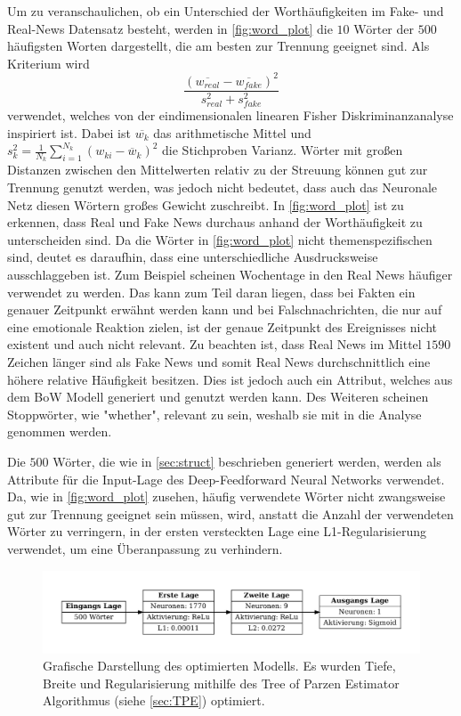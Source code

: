 Um zu veranschaulichen, ob ein Unterschied der Worthäufigkeiten im Fake- und Real-News Datensatz besteht, werden in \autoref{fig:word_plot}
die $10$ Wörter der $500$ häufigsten Worten dargestellt, die am besten zur Trennung geeignet sind. 
Als Kriterium wird 
\begin{equation}
    \frac{(\overline{w_{real}}-\overline{w_{fake}})^2}{s_{real}^2+s_{fake}^2}
\end{equation}
verwendet, welches von der eindimensionalen linearen Fisher Diskriminanzanalyse inspiriert ist. 
Dabei ist $\overline{w_k}$ das arithmetische Mittel und $s_{k}^{2}=\frac{1}{N_k}\sum_{i=1}^{N_{k}}\left(w_{k i}-\overline{w}_{k}\right)^{2}$ 
die Stichproben Varianz.
Wörter mit großen Distanzen zwischen den Mittelwerten relativ zu der Streuung können gut zur Trennung genutzt werden, was 
jedoch nicht bedeutet, dass auch das Neuronale Netz diesen Wörtern großes Gewicht zuschreibt.
In \autoref{fig:word_plot} ist zu erkennen, dass Real und Fake News durchaus anhand der Worthäufigkeit zu unterscheiden sind. 
Da die Wörter in \autoref{fig:word_plot} nicht themenspezifischen sind, deutet es daraufhin, dass eine unterschiedliche 
Ausdrucksweise ausschlaggeben ist. 
Zum Beispiel scheinen Wochentage in den Real News häufiger verwendet zu werden. 
Das kann zum Teil daran liegen, dass bei Fakten ein genauer Zeitpunkt erwähnt werden kann und bei Falschnachrichten, die 
nur auf eine emotionale Reaktion zielen, ist der genaue Zeitpunkt des Ereignisses nicht existent und auch nicht relevant.
Zu beachten ist, dass Real News im Mittel $\num{1590}$ Zeichen länger sind als Fake News und somit Real News durchschnittlich
eine höhere relative Häufigkeit besitzen.
Dies ist jedoch auch ein Attribut, welches aus dem BoW Modell generiert und genutzt werden kann.
Des Weiteren scheinen Stoppwörter, wie "whether", relevant zu sein, weshalb sie mit in die Analyse genommen werden.

Die $500$ Wörter, die wie in \autoref{sec:struct} beschrieben generiert werden, werden als Attribute 
für die Input-Lage des Deep-Feedforward Neural Networks verwendet. 
Da, wie in \autoref{fig:word_plot} zusehen, häufig verwendete Wörter nicht zwangsweise gut zur Trennung geeignet 
sein müssen, wird, anstatt die Anzahl der verwendeten Wörter zu verringern, in der ersten versteckten Lage eine 
L1-Regularisierung verwendet, um eine Überanpassung zu verhindern.

\begin{figure}
    \centering
    \includegraphics[width=\textwidth]{pictures/modell_scheme.pdf}
    \caption{Grafische Darstellung des optimierten Modells. Es wurden Tiefe, Breite und Regularisierung mithilfe 
            des Tree of Parzen Estimator Algorithmus (siehe \autoref{sec:TPE}) optimiert.}
    \label{fig:NN_structure}
\end{figure}

